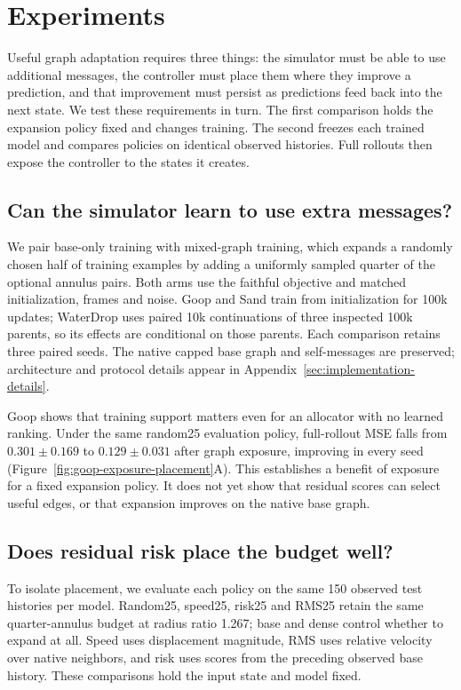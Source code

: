 \section{Experiments}
Useful graph adaptation requires three things: the simulator must be able to use additional messages, the controller must place them where they improve a prediction, and that improvement must persist as predictions feed back into the next state. We test these requirements in turn. The first comparison holds the expansion policy fixed and changes training. The second freezes each trained model and compares policies on identical observed histories. Full rollouts then expose the controller to the states it creates.

\subsection{Can the simulator learn to use extra messages?}
We pair base-only training with mixed-graph training, which expands a randomly chosen half of training examples by adding a uniformly sampled quarter of the optional annulus pairs. Both arms use the faithful objective and matched initialization, frames and noise. Goop and Sand train from initialization for 100k updates; WaterDrop uses paired 10k continuations of three inspected 100k parents, so its effects are conditional on those parents. Each comparison retains three paired seeds. The native capped base graph and self-messages are preserved; architecture and protocol details appear in Appendix~\ref{sec:implementation-details}.

Goop shows that training support matters even for an allocator with no learned ranking. Under the same random25 evaluation policy, full-rollout MSE falls from $0.301\pm0.169$ to $0.129\pm0.031$ after graph exposure, improving in every seed (Figure~\ref{fig:goop-exposure-placement}A). This establishes a benefit of exposure for a fixed expansion policy. It does not yet show that residual scores can select useful edges, or that expansion improves on the native base graph.


\subsection{Does residual risk place the budget well?}
To isolate placement, we evaluate each policy on the same 150 observed test histories per model. Random25, speed25, risk25 and RMS25 retain the same quarter-annulus budget at radius ratio 1.267; base and dense control whether to expand at all. Speed uses displacement magnitude, RMS uses relative velocity over native neighbors, and risk uses scores from the preceding observed base history. These comparisons hold the input state and model fixed.

